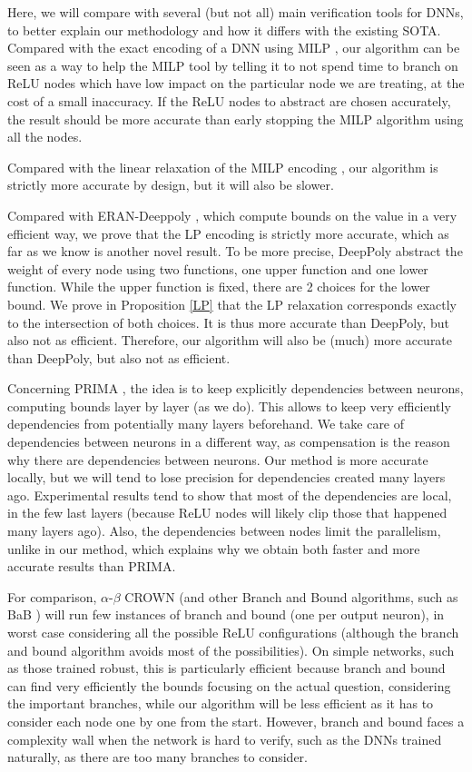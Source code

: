 \smallskip

 Here, we will compare with several (but not all) main verification tools for DNNs, to better explain our methodology and how it differs with the existing SOTA. Compared with the exact encoding of a DNN using MILP \cite{MILP}, our algorithm can be seen as a way to help the MILP tool by telling it to not spend time to branch on ReLU nodes which have low impact on the particular node we are treating, at the cost of a small inaccuracy. If the ReLU nodes to abstract are chosen accurately, the result should be more accurate than early stopping the MILP algorithm using all the nodes.

Compared with the linear relaxation of the MILP encoding \cite{MILP}, our algorithm is strictly more accurate by design, but it will also be slower.

Compared with ERAN-Deeppoly \cite{deeppoly}, which compute bounds on the value in a very efficient way, we prove that the LP encoding is strictly more accurate, which as far as we know is another novel result. To be more precise, DeepPoly
abstract the weight of every node using two functions, one upper function and one lower function. While the upper function is fixed, there are 2 choices for the lower bound.
We prove in Proposition  \ref{LP} that the LP relaxation corresponds exactly to the intersection of both choices. It is thus more accurate than DeepPoly, but also not as efficient. Therefore, our algorithm will also be (much) more accurate than DeepPoly, but also not as efficient.

Concerning PRIMA \cite{prima}, the idea is to keep explicitly dependencies between neurons, computing bounds layer by layer (as we do). This allows to keep very efficiently dependencies from potentially many layers beforehand. We take care of dependencies between neurons in a different way, as compensation is the reason why there are dependencies between neurons. 
Our method is more accurate locally, but we will tend to lose precision for dependencies created many layers ago. Experimental results tend to show that most of the dependencies are local, in the few last layers (because ReLU nodes will likely clip those that happened many layers ago). Also, the dependencies between nodes limit the parallelism, unlike in our method, which explains why we obtain both faster and more accurate results than PRIMA.

For comparison, $\alpha$-$\beta$ CROWN \cite{crown} (and other Branch and Bound algorithms, such as BaB \cite{BaB}) will run few instances of branch and bound (one per output neuron), in worst case considering all the possible ReLU configurations (although the branch and bound algorithm avoids most of the possibilities). On simple networks, such as those trained robust, this is particularly efficient because branch and bound can find very efficiently the bounds focusing on the actual question, considering the important branches, while our algorithm will be less efficient as it has to consider each node one by one from the start. However, branch and bound faces a complexity wall when the network is hard to verify, such as the DNNs trained naturally, as there are too many branches to consider.

